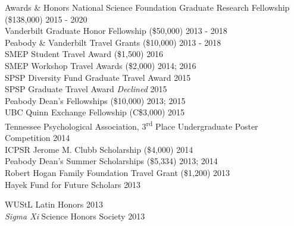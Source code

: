 \begin{rSection}{\textrm{Awards \& Honors}}
National Science Foundation Graduate Research Fellowship (\$138,000) 	\hfill{2015 - 2020}\smallskip\\
Vanderbilt Graduate Honor Fellowship (\$50,000)				\hfill{2013 - 2018}\smallskip\\	
Peabody \& Vanderbilt Travel Grants (\$10,000)				\hfill  {2013 - 2018}\smallskip\\
SMEP Student Travel Award (\$1,500)						\hfill{2016}\smallskip\\
SMEP Workshop Travel Awards (\$2,000)					\hfill{2014; 2016}\smallskip\\
SPSP Diversity Fund Graduate Travel Award %
\hfill{2015}\smallskip\\
SPSP Graduate Travel Award %
{\small \textit{Declined}} \hfill{2015}\smallskip\\
Peabody Dean's Fellowships (\$10,000)					\hfill  {2013; 2015}\smallskip\\
UBC Quinn Exchange Fellowship (C\$3,000) \hfill{2015}\smallskip\\
Tennessee Psychological Association, 3\textsuperscript{rd} Place Undergraduate Poster Competition \hfill{2014}\smallskip\\
ICPSR Jerome M. Clubb Scholarship (\$4,000) \hfill{2014}\smallskip\\
Peabody Dean's Summer Scholarships (\$5,334)			    \hfill  {2013; 2014}\smallskip\\	
Robert Hogan Family Foundation Travel Grant (\$1,200) 	\hfill  {2013}\smallskip\\
Hayek Fund for Future Scholars                      \hfill  {2013}\smallskip\\
\begin{minipage}{\linewidth}\vspace{1.1mm} WUStL Latin Honors \hfill  {2013}\smallskip\\
\textit{Sigma Xi} Science Honors Society                    			\hfill  {2013}
\end{minipage}%
\end{rSection}


